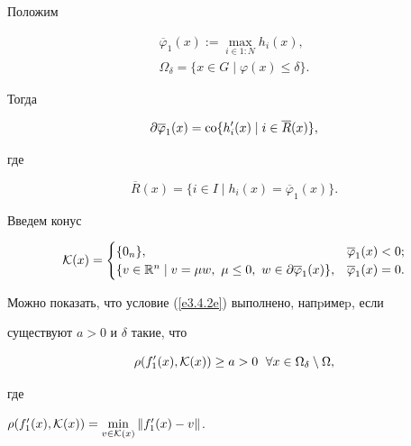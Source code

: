 \begin{notes}


Положим


\begin{gather*}




\overline \varphi_1(x):=\max_{i\in 1:N}h_i(x), \\






\Omega_\delta=\{x \in G\mid \varphi(x)\leq \delta\}.




\end{gather*}


Тогда


$$


\partial\overline \varphi_1(x)=\co\{h'_i(x)\mid i\in \overline R(x)\},


$$


где


$$


\overline R(x)=\{i\in I\mid h_i(x)=\overline \varphi_1(x)\}.


$$


Введем конус


$$




{\cal K}(x)=


\begin{cases}


\{0_n\}, & \overline \varphi_1(x)<0; \\


\{v\in \Bbb R^n\mid v=\mu w,\ \mu\leq0,


\ w\in \partial\overline \varphi_1(x)\},


& \overline \varphi_1(x)=0. 


\end{cases}




$$


Можно показать, что условие (\ref{e3.4.2e}) выполнено, напpимеp, если


существуют $a>0$ и $\delta$ такие, что


$$


\rho(f'_1(x), {\cal K}(x))\geq a>0 \ \; \forall x\in \Omega_\delta \setminus


\Omega,


$$


где


$\rho(f'_1(x), {\cal K}(x))=\min\limits_{v\in {\cal K}(x)}\|f'_1(x)-v\|$.


\end{notes}





